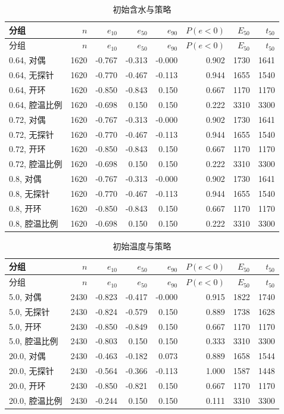 \begin{longtable}{lrrrrrrr}
\caption{初始含水与策略}\\
\toprule
分组 & $n$ & $e_{10}$ & $e_{50}$ & $e_{90}$ & $P(e{<}0)$ & $E_{50}$ & $t_{50}$ \\
\midrule
\endfirsthead
\toprule
分组 & $n$ & $e_{10}$ & $e_{50}$ & $e_{90}$ & $P(e{<}0)$ & $E_{50}$ & $t_{50}$ \\
\midrule
\endhead
0.64, 对偶 & 1620 & -0.767 & -0.313 & -0.000 & 0.902 & 1730 & 1641 \\
0.64, 无探针 & 1620 & -0.770 & -0.467 & -0.113 & 0.944 & 1655 & 1540 \\
0.64, 开环 & 1620 & -0.850 & -0.843 & 0.150 & 0.667 & 1170 & 1170 \\
0.64, 腔温比例 & 1620 & -0.698 & 0.150 & 0.150 & 0.222 & 3310 & 3300 \\
0.72, 对偶 & 1620 & -0.767 & -0.313 & -0.000 & 0.902 & 1730 & 1641 \\
0.72, 无探针 & 1620 & -0.770 & -0.467 & -0.113 & 0.944 & 1655 & 1540 \\
0.72, 开环 & 1620 & -0.850 & -0.843 & 0.150 & 0.667 & 1170 & 1170 \\
0.72, 腔温比例 & 1620 & -0.698 & 0.150 & 0.150 & 0.222 & 3310 & 3300 \\
0.8, 对偶 & 1620 & -0.767 & -0.313 & -0.000 & 0.902 & 1730 & 1641 \\
0.8, 无探针 & 1620 & -0.770 & -0.467 & -0.113 & 0.944 & 1655 & 1540 \\
0.8, 开环 & 1620 & -0.850 & -0.843 & 0.150 & 0.667 & 1170 & 1170 \\
0.8, 腔温比例 & 1620 & -0.698 & 0.150 & 0.150 & 0.222 & 3310 & 3300 \\
\bottomrule
\end{longtable}

\begin{longtable}{lrrrrrrr}
\caption{初始温度与策略}\\
\toprule
分组 & $n$ & $e_{10}$ & $e_{50}$ & $e_{90}$ & $P(e{<}0)$ & $E_{50}$ & $t_{50}$ \\
\midrule
\endfirsthead
\toprule
分组 & $n$ & $e_{10}$ & $e_{50}$ & $e_{90}$ & $P(e{<}0)$ & $E_{50}$ & $t_{50}$ \\
\midrule
\endhead
5.0, 对偶 & 2430 & -0.823 & -0.417 & -0.000 & 0.915 & 1822 & 1740 \\
5.0, 无探针 & 2430 & -0.824 & -0.579 & 0.150 & 0.889 & 1738 & 1628 \\
5.0, 开环 & 2430 & -0.850 & -0.849 & 0.150 & 0.667 & 1170 & 1170 \\
5.0, 腔温比例 & 2430 & -0.803 & 0.150 & 0.150 & 0.333 & 3310 & 3300 \\
20.0, 对偶 & 2430 & -0.463 & -0.182 & 0.073 & 0.889 & 1658 & 1544 \\
20.0, 无探针 & 2430 & -0.564 & -0.366 & -0.113 & 1.000 & 1587 & 1448 \\
20.0, 开环 & 2430 & -0.850 & -0.821 & 0.150 & 0.667 & 1170 & 1170 \\
20.0, 腔温比例 & 2430 & -0.244 & 0.150 & 0.150 & 0.111 & 3310 & 3300 \\
\bottomrule
\end{longtable}
